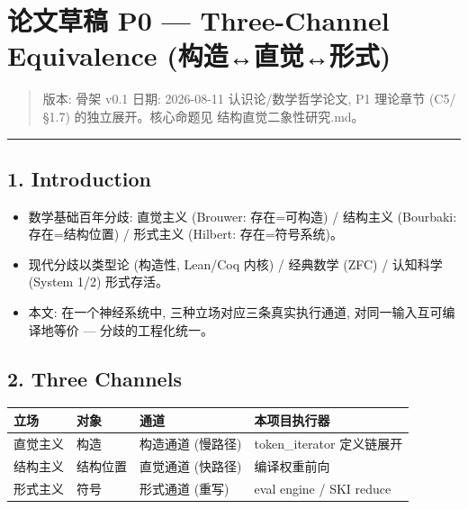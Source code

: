 \documentclass[
]{article}
\author{}
\date{}
\providecommand{\tightlist}{%
  \setlength{\itemsep}{0pt}\setlength{\parskip}{0pt}}
\begin{document}
\section{论文草稿 P0 --- Three-Channel Equivalence
(构造↔直觉↔形式)}\label{ux8bbaux6587ux8349ux7a3f-p0-three-channel-equivalence-ux6784ux9020ux76f4ux89c9ux5f62ux5f0f}

\begin{quote}
版本: 骨架 v0.1 \textbar{} 日期: 2026-08-11 \textbar{}
认识论/数学哲学论文, P1 理论章节 (C5/§1.7) 的独立展开。核心命题见
结构直觉二象性研究.md。
\end{quote}

\begin{center}\rule{0.5\linewidth}{0.5pt}\end{center}

\subsection{1. Introduction}\label{introduction}

\begin{itemize}
\tightlist
\item
  数学基础百年分歧: 直觉主义 (Brouwer: 存在=可构造) / 结构主义
  (Bourbaki: 存在=结构位置) / 形式主义 (Hilbert: 存在=符号系统)。
\item
  现代分歧以类型论 (构造性, Lean/Coq 内核) / 经典数学 (ZFC) / 认知科学
  (System 1/2) 形式存活。
\item
  本文: 在一个神经系统中, 三种立场对应三条真实执行通道,
  对同一输入互可编译地等价 --- 分歧的工程化统一。
\end{itemize}

\subsection{2. Three Channels}\label{three-channels}

\begin{longtable}[]{@{}llll@{}}
\toprule\noalign{}
立场 & 对象 & 通道 & 本项目执行器 \\
\midrule\noalign{}
\endhead
\bottomrule\noalign{}
\endlastfoot
直觉主义 & 构造 & 构造通道 (慢路径) & token\_iterator 定义链展开 \\
结构主义 & 结构位置 & 直觉通道 (快路径) & 编译权重前向 \\
形式主义 & 符号 & 形式通道 (重写) & eval engine / SKI reduce \\
\end{longtable}
\end{document}
